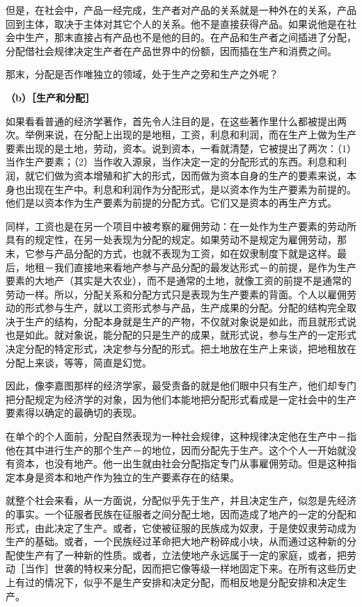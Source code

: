 \documentclass[a4paper,twoside,12pt,AutoFakeBold]{ctexart}
\begin{document}
但是，在社会中，产品一经完成，生产者对产品的关系就是一种外在的关系，产品回到主体，取决于主体对其它个人的关系。他不是直接获得产品。如果说他是在社会中生产，那末直接占有产品也不是他的目的。在产品和生产者之间插进了分配，分配借社会规律决定生产者在产品世界中的份额，因而插在生产和消费之间。

那末，分配是否作唯独立的领域，处于生产之旁和生产之外呢？

\textbf{（b）［生产和分配］}

如果看看普通的经济学著作，首先令人注目的是，在这些著作里什么都被提出两次。举例来说，在分配上出现的是地租，工资，利息和利润，而在生产上做为生产要素出现的是土地，劳动，资本。说到资本，一看就清楚，它被提出了两次：（1）当作生产要素；（2）当作收入源泉，当作决定一定的分配形式的东西。利息和利润，就它们做为资本增殖和扩大的形式，因而做为资本自身的生产的要素来说，本身也出现在生产中。利息和利润作为分配形式，是以资本作为生产要素为前提的。他们是以资本作为生产要素为前提的分配方式。它们又是资本的再生产方式。

同样，工资也是在另一个项目中被考察的雇佣劳动：在一处作为生产要素的劳动所具有的规定性，在另一处表现为分配的规定。如果劳动不是规定为雇佣劳动，那末，它参与产品分配的方式，也就不表现为工资，如在奴隶制度下就是这样。最后，地租－我们直接地来看地产参与产品分配的最发达形式－的前提，是作为生产要素的大地产（其实是大农业），而不是通常的土地，就像工资的前提不是通常的劳动一样。所以，分配关系和分配方式只是表现为生产要素的背面。个人以雇佣劳动的形式参与生产，就以工资形式参与产品，生产成果的分配。分配的结构完全取决于生产的结构，分配本身就是生产的产物，不仅就对象说是如此，而且就形式说也是如此。就对象说，能分配的只是生产的成果，就形式说，参与生产的一定形式决定分配的特定形式，决定参与分配的形式。把土地放在生产上来谈，把地租放在分配上来谈，等等，简直是幻觉。

因此，像李嘉图那样的经济学家，最受责备的就是他们眼中只有生产，他们却专门把分配规定为经济学的对象，因为他们本能地把分配形式看成是一定社会中的生产要素得以确定的最确切的表现。

在单个的个人面前，分配自然表现为一种社会规律，这种规律决定他在生产中－指他在其中进行生产的那个生产－的地位，因而分配先于生产。这个个人一开始就没有资本，也没有地产。他一出生就由社会分配指定专门从事雇佣劳动。但是这种指定本身是资本和地产作为独立的生产要素存在的结果。

就整个社会来看，从一方面说，分配似乎先于生产，并且决定生产，似忽是先经济的事实。一个征服者民族在征服者之间分配土地，因而造成了地产的一定的分配和形式，由此决定了生产。或者，它使被征服的民族成为奴隶，于是使奴隶劳动成为生产的基础。或者，一个民族经过革命把大地产粉碎成小块，从而通过这种新的分配使生产有了一种新的性质。或者，立法使地产永远属于一定的家庭，或者，把劳动［当作］世袭的特权来分配，因而把它像等级一样地固定下来。在所有这些历史上有过的情况下，似乎不是生产安排和决定分配，而相反地是分配安排和决定生产。
\end{document}
